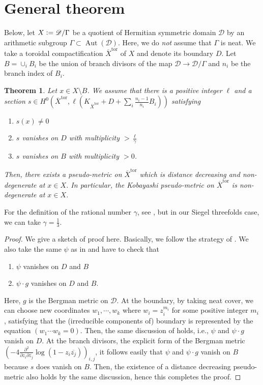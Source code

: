 \documentclass[12pt, pdftex]{amsart}
\theoremstyle{plain}
\newtheorem{thm}{Theorem}[section]
\theoremstyle{definition}
\numberwithin{equation}{section}
\def\Aut{\mathop{\mathrm{Aut}}\nolimits}
\def\tor{\mathrm{tor}}
\def\D{\mathscr{D}}
\newcommand{\defeq}{\vcentcolon=}
\begin{document}
\section{General theorem}
Below, let $X\defeq\D/\Gamma$ be a quotient of Hermitian symmetric domain $\D$ by an arithmetic subgroup $\Gamma\subset\Aut(\D)$.
Here, we do \textit{not} assume that $\Gamma$ is neat.
We take a toroidal compactification $\overline{X}^{\tor}$ of $X$ and denote its boundary $D$.
Let $B=\cup_i B_i$ be the union of branch divisors of the map $\D\to\D/\Gamma$ and $n_i$ be the branch index of $B_i$.
\begin{thm}
\label{thm:hyperbolicity}
Let $x\in X\setminus B$.
We assume that there is a positive integer $\ell$ and a section $s\in H^0(\overline{X}^{\tor}, \ell(K_{\overline{X}^{\tor}}+D+\sum_i \frac{n_i-1}{n_i}B_i))$ satisfying 
\begin{enumerate}
\item $s(x)\neq 0$
\item $s$ vanishes on $D$ with multiplicity $>\frac{\ell}{\gamma}$
\item $s$ vanishes on $B$ with multiplicity $>0$.
\end{enumerate}
Then, there exists a pseudo-metric on $\overline{X}^{\tor}$ which is distance decreasing and  non-degenerate at $x\in X$.
In particular, the Kobayashi pseudo-metric on $\overline{X}^{\tor}$ is non-degenerate at $x\in X$.
\end{thm}
For the definition of the rational number $\gamma$, see \cite[p3]{Rou13}, but in our Siegel threefolds case, we can take $\gamma=\frac{1}{3}$.
\begin{proof}
We give a sketch of proof here.
Basically,  we follow the strategy of \cite[Proposition 2.2, 2.3, 2.4]{Rou13}.
We also take the same $\psi$ as in \cite{Rou13} and have to check that
\begin{enumerate}
\item $\psi$ vanishes on $D$ and $B$
\item $\psi\cdot g$ vanishes on $D$ and $B$.
\end{enumerate}
Here, $g$ is the Bergman metric on $\D$.
At the boundary, by taking neat cover, we can choose new coordinates $w_1,\cdots,  w_k$ where $w_i=z_i^{m_i}$ for some positive integer $m_i$, satisfying that the (irreducible components of) boundary is represented by the equation $(w_1\cdots w_k=0)$.
Then, the same discussion of \cite[Proposition 2.2, 2.3]{Rou13} holds, i.e., $\psi$ and $\psi\cdot g$ vanish on $D$.
At the branch divisors, the explicit form of the Bergman metric $(-4\frac{\partial^2}{\partial z_i\partial \overline{z_j}}\log(1-z_i\overline{z_j}))_{i,j}$, it follows easily that $\psi$ and $\psi\cdot g$ vanish on $B$ because $s$ does vanish on $B$.
Then, the existence of a distance decreasing pseudo-metric \cite[Proposition 2.4]{Rou13} also holds by the same discussion, hence this completes the proof.
\end{proof}
\end{document}
